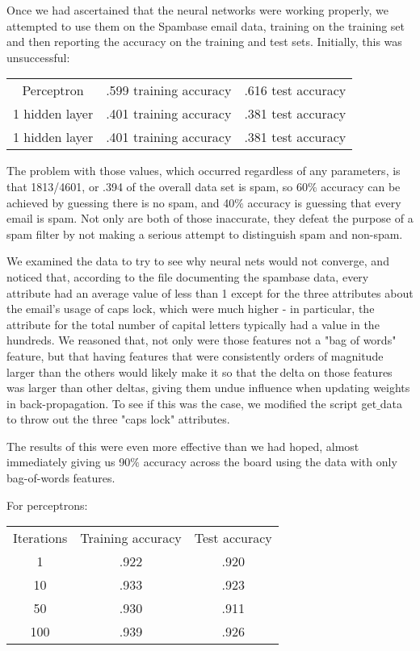 \documentclass[11pt]{article} %
\begin{document}
Once we had ascertained that the neural networks were working properly, we attempted to use them on the Spambase email data, training on the training set and then reporting the accuracy on the training and test sets. Initially, this was unsuccessful:

\singlespacing
\begin{tabular}{|c|c|c|}
\hline
Perceptron & .599 training accuracy & .616 test accuracy \\
1 hidden layer & .401 training accuracy & .381 test accuracy \\
1 hidden layer & .401 training accuracy & .381 test accuracy \\
\hline
\end{tabular}
\doublespacing

\bigskip
The problem with those values, which occurred regardless of any parameters, is that 1813/4601, or .394 of the overall data set is spam, so 60$\%$ accuracy can be achieved by guessing there is no spam, and 40$\%$ accuracy is guessing that every email is spam. Not only are both of those inaccurate, they defeat the purpose of a spam filter by not making a serious attempt to distinguish spam and non-spam.

We examined the data to try to see why neural nets would not converge, and noticed that, according to the file documenting the spambase data, every attribute had an average value of less than 1 except for the three attributes about the email's usage of caps lock, which were much higher - in particular, the attribute for the total number of capital letters typically had a value in the hundreds. We reasoned that, not only were those features not a "bag of words" feature, but that having features that were consistently orders of magnitude larger than the others would likely make it so that the delta on those features was larger than other deltas, giving them undue influence when updating weights in back-propagation. To see if this was the case, we modified the script get$\_$data to throw out the three "caps lock" attributes.

The results of this were even more effective than we had hoped, almost immediately giving us 90$\%$ accuracy across the board using the data with only bag-of-words features.

For perceptrons:

\singlespacing
\begin{tabular}{|c|c|c|}
\hline
Iterations & Training accuracy & Test accuracy \\
1 & .922 & .920 \\
10 & .933 & .923 \\
50 & .930 & .911 \\
100 & .939 & .926 \\
\hline
\end{tabular}
\doublespacing
\end{document}
